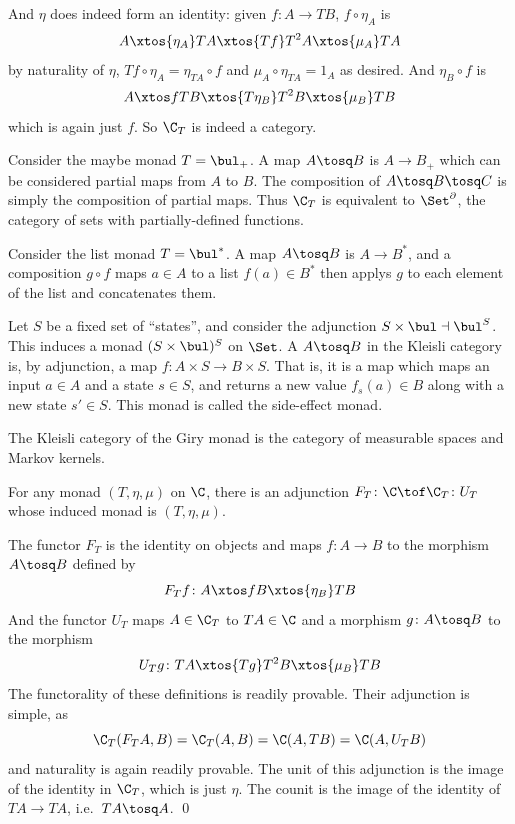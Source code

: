 And $\eta$ does indeed form an identity: given $f\colon A\to TB$, $f\circ\eta_A$ is
$$ A \xtos{\eta_A} TA \xtos{Tf} T^2A \xtos{\mu_A} TA $$
by naturality of $\eta$, $Tf\circ\eta_A=\eta_{TA}\circ f$ and $\mu_A\circ\eta_{TA}=1_A$ as desired.
And $\eta_B\circ f$ is
$$ A \xtos f TB \xtos{T\eta_B} T^2B \xtos{\mu_B} TB $$
which is again just $f$.
So $\C_T$ is indeed a category.

\bexam

    \benum
        \item Consider the maybe monad $T=\bul_+$.
        A map $A\tosq B$ is $A\to B_+$ which can be considered partial maps from $A$ to $B$.
        The composition of $A\tosq B\tosq C$ is simply the composition of partial maps.
        Thus $\C_T$ is equivalent to $\Set^\partial$, the category of sets with partially-defined functions.

        \item Consider the list monad $T=\bul^*$.
        A map $A\tosq B$ is $A\to B^*$, and a composition $g\circ f$ maps $a\in A$ to a list $f(a)\in B^*$ then applys $g$ to each element of the list and concatenates them.

        \item Let $S$ be a fixed set of ``states'', and consider the adjunction $S\times\bul\dashv\bul^S$.
        This induces a monad $(S\times\bul)^S$ on $\Set$.
        A $A\tosq B$ in the Kleisli category is, by adjunction, a map $f\colon A\times S\to B\times S$.
        That is, it is a map which maps an input $a\in A$ and a state $s\in S$, and returns a new value $f_s(a)\in B$ along with a new state $s'\in S$.
        This monad is called the {\emphcolor side-effect monad}.

        \item The Kleisli category of the Giry monad is the category of measurable spaces and {\emphcolor Markov kernels}.
    \eenum

\eexam

\blemm

    For any monad $(T,\eta,\mu)$ on $\C$, there is an adjunction $F_T\colon\C\tof\C_T\colon U_T$ whose induced monad is $(T,\eta,\mu)$.

\elemm

\bproof

    The functor $F_T$ is the identity on objects and maps $f\colon A\to B$ to the morphism $A\tosq B$ defined by
    $$ F_Tf\colon A\xtos fB\xtos{\eta_B}TB $$
    And the functor $U_T$ maps $A\in\C_T$ to $TA\in\C$ and a morphism $g\colon A\tosq B$ to the morphism
    $$ U_Tg\colon TA\xtos{Tg}T^2B\xtos{\mu_B}TB $$
    The functorality of these definitions is readily provable.
    Their adjunction is simple, as
    $$ \C_T(F_TA,B) = \C_T(A,B) = \C(A,TB) = \C(A,U_TB) $$
    and naturality is again readily provable.
    The unit of this adjunction is the image of the identity in $\C_T$, which is just $\eta$.
    The counit is the image of the identity of $TA\to TA$, i.e.\ $TA\tosq A$.
    \qed

